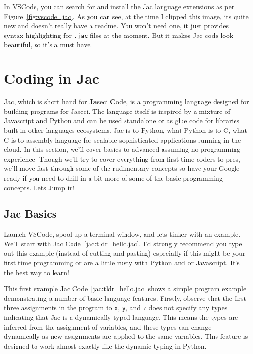 \par
In VSCode, you can search for and install the Jac language extensions as per Figure~\ref{fig:vscode_jac}. As you can see, at the time I clipped this image, its quite new and doesn't really have a readme. You won't need one, it just provides syntax highlighting for \texttt{.jac} files at the moment. But it makes Jac code look beautiful, so it's a must have.

\section{Coding in Jac}

Jac, which is short hand for \textbf{Ja}seci \textbf{C}ode,  is a programming language designed for building programs for Jaseci. The language itself is inspired by a mixture of Javascript and Python and can be used standalone or as glue code for libraries built in other languages ecosystems. Jac is to Python, what Python is to C, what C is to assembly language for scalable sophisticated applications running in the cloud. In this section, we'll cover basics to advanced assuming no programming experience. Though we'll try to cover everything from first time coders to pros, we'll move fast through some of the rudimentary concepts so have your Google ready if you need to drill in a bit more of some of the basic programming concepts. Lets Jump in!

\subsection{Jac Basics}

Launch VSCode, spool up a terminal window, and lets tinker with an example. We'll start with Jac Code~\ref{jac:tldr_hello.jac}. I'd strongly recommend you type out this example (instead of cutting and pasting) especially if this might be your first time programming or are a little rusty with Python and or Javascript. It's the best way to learn!

\par
{}

This first example Jac Code~\ref{jac:tldr_hello.jac} shows a simple program example demonstrating a number of basic language features. Firstly, observe that the first three assignments in the program to \texttt{x}, \texttt{y}, and \texttt{z} does not specify any types indicating that Jac is a \gls{dynamically typed language}. This means the types are inferred from the assignment of variables, and these types can change dynamically as new assignments are applied to the same variables. This feature is designed to work almost exactly like the dynamic typing in Python.

